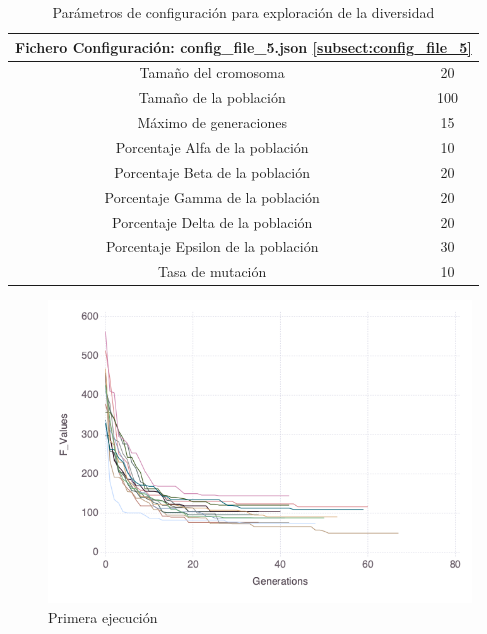 \begin{table}[]
    \centering
    \begin{tabular}{||c|c||}
        \hline
        \multicolumn{2}{|l|}{\textbf{Fichero Configuración: config\_file\_5.json} \ref{subsect:config_file_5}} \\ \hline
        Tamaño del cromosoma                            & 20              \\ \hline
        Tamaño de la población                          & 100             \\ \hline
        Máximo de generaciones                          & 15              \\ \hline
        Porcentaje Alfa de la población                 & 10              \\ \hline
        Porcentaje Beta de la población                 & 20              \\ \hline
        Porcentaje Gamma de la población                & 20              \\ \hline
        Porcentaje Delta de la población                & 20              \\ \hline
        Porcentaje Epsilon de la población              & 30              \\ \hline
        Tasa de mutación                               & 10              \\ \hline
    \end{tabular}
    \caption{Parámetros de configuración para exploración de la diversidad}
    \label{tab:diversity_config}
\end{table}

\begin{figure}[H]
	\centering	
	\includegraphics[scale=0.6]{../data/Plots/config_file_5_Rastrigin.png}
	\caption{Primera ejecución}
    \label{fig:primera_ejecucion}
\end{figure}

